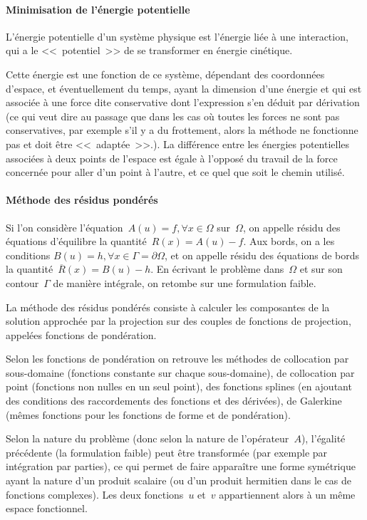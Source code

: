 \medskip
\paragraph{Minimisation de l'énergie potentielle}
L'énergie potentielle d'un système physique est l'énergie liée à une interaction, qui a le
<<~potentiel~>> de se transformer en énergie cinétique.

Cette énergie est une fonction de ce système, dépendant des coordonnées d'espace,
et éventuellement du temps, ayant la dimension d'une énergie et qui est associée à une
force dite conservative dont l'expression s'en déduit par dérivation (ce qui veut dire au passage
que dans les cas où toutes les forces ne sont pas conservatives, par exemple s'il y a
du frottement, alors la méthode ne fonctionne pas et doit être <<~adaptée~>>.).
La différence entre les énergies potentielles associées à deux points de l'espace est
égale à l'opposé du travail de la force concernée pour aller d'un point à l'autre, et ce
quel que soit le chemin utilisé.

\medskip
\paragraph{Méthode des résidus pondérés}\label{Sec-ResPond}
Si l'on considère l'équation~$A(u)=f, \forall x\in\Omega$ sur~$\Omega$, on appelle résidu
des équations d'équilibre la quantité~$R(x)=A(u)-f$. Aux bords, on a les conditions
$B(u)=h, \forall x\in\Gamma=\partial\Omega$, et on appelle résidu des équations de bords
la quantité~$\overline{R}(x)=B(u)-h$. En écrivant le problème dans~$\Omega$ et sur
son contour~$\Gamma$ de manière intégrale, on retombe sur une formulation faible.

La méthode des résidus pondérés consiste à calculer les composantes de la
solution approchée par la projection sur des couples de fonctions de projection,
appelées fonctions de pondération.

Selon les fonctions de pondération on retrouve les méthodes de collocation par
sous-domaine (fonctions constante sur chaque sous-domaine), de collocation par point
(fonctions non nulles en un seul point), des fonctions splines (en ajoutant des conditions
des raccordements des fonctions et des dérivées), de Galerkine
(mêmes fonctions
pour les fonctions de forme et de pondération).

\medskip
Selon la nature du problème (donc selon la nature de l'opérateur~$A$),
l'égalité précédente (la formulation faible) peut être transformée
(par exemple par intégration par parties), ce qui permet de faire apparaître une
forme symétrique ayant la nature d'un produit scalaire (ou d'un produit hermitien dans le cas
de fonctions complexes).
Les deux fonctions~$u$ et~$v$ appartiennent alors à un même espace fonctionnel.

